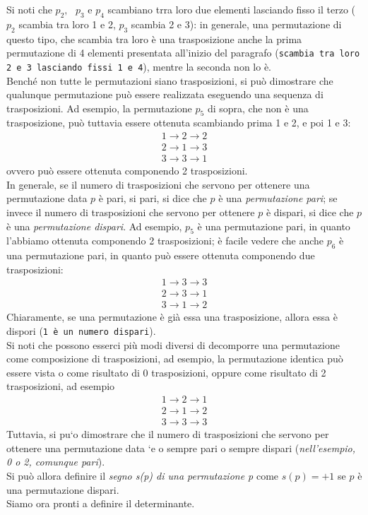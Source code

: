 \documentclass{book}
\begin{document}
Si noti che $p_2, \text{ } p_3$ e $p_4$ scambiano trra loro due elementi lasciando fisso il terzo ($p_2$ scambia tra loro 1 e 2, $p_3$ scambia 2 e 3): in generale, una permutazione di questo tipo, che scambia tra loro è una trasposizione anche la prima permutazione di 4 elementi presentata all'inizio del paragrafo ({\tt scambia tra loro 2 e 3 lasciando fissi 1 e 4}), mentre la seconda non lo è.\\
Benché non tutte le permutazioni siano trasposizioni, si può dimostrare che qualunque permutazione può essere realizzata eseguendo una sequenza di trasposizioni. Ad esempio, la permutazione $p_5$ di sopra, che non è una trasposizione, può tuttavia essere ottenuta scambiando prima 1 e 2, e poi 1 e 3:
\begin{equation*}
  \begin{matrix}
    1 \to 2 \to 2\\
    2 \to 1 \to 3\\
    3 \to 3 \to 1
  \end{matrix}
\end{equation*}
ovvero può essere ottenuta componendo 2 trasposizioni.\\
In generale, se il numero di trasposizioni che servono per ottenere una permutazione data $p$ è pari, si pari, si dice che $p$ è una {\em permutazione pari}; se invece il numero di trasposizioni che servono per ottenere $p$ è dispari, si dice che $p$ è una {\em permutazione dispari}. Ad esempio, $p_5$ è una permutazione pari, in quanto l'abbiamo ottenuta componendo 2 trasposizioni; è facile vedere che anche $p_6$ è una permutazione pari, in quanto può essere ottenuta componendo due trasposizioni:
\begin{equation*}
  \begin{matrix}
    1 \to 3 \to 3\\
    2 \to 3 \to 1\\
    3 \to 1 \to 2
  \end{matrix}
\end{equation*}
Chiaramente, se una permutazione è già essa una trasposizione, allora essa è dispori ({\tt 1 è un numero dispari}).\\
Si noti che possono esserci più modi diversi di decomporre una permutazione come composizione di trasposizioni, ad esempio, la permutazione identica può essere vista o come risultato di 0 trasposizioni, oppure come risultato di 2 trasposizioni, ad esempio
\begin{equation*}
  \begin{matrix}
    1 \to 2 \to 1\\
    2 \to 1 \to 2\\
    3 \to 3 \to 3
  \end{matrix}
\end{equation*}
Tuttavia, si pu`o dimostrare che il numero di trasposizioni che servono per ottenere una permutazione data `e o sempre pari o sempre dispari ({\it nell’esempio, 0 o 2, comunque pari}).\\
Si può allora definire il \textit{segno s(p) di una permutazione p} come $s(p)=+1$ se $p$ è una permutazione dispari.\\
Siamo ora pronti a definire il determinante.
\end{document}
